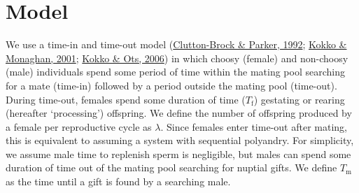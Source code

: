 \documentclass[
]{article}
\begin{document}
\hypertarget{model}{%
\section{Model}\label{model}}

We use a time-in and time-out model
(\protect\hyperlink{ref-Clutton-Brock1992}{Clutton-Brock \& Parker,
1992}; \protect\hyperlink{ref-Kokko2001}{Kokko \& Monaghan, 2001};
\protect\hyperlink{ref-Kokko2006}{Kokko \& Ots, 2006}) in which choosy
(female) and non-choosy (male) individuals spend some period of time
within the mating pool searching for a mate (time-in) followed by a
period outside the mating pool (time-out). During time-out, females
spend some duration of time (\(T_{\mathrm{f}}\)) gestating or rearing
(hereafter `processing') offspring. We define the number of offspring
produced by a female per reproductive cycle as \(\lambda\). Since
females enter time-out after mating, this is equivalent to assuming a
system with sequential polyandry. For simplicity, we assume male time to
replenish sperm is negligible, but males can spend some duration of time
out of the mating pool searching for nuptial gifts. We define
\(T_{\mathrm{m}}\) as the time until a gift is found by a searching
male.
\end{document}
